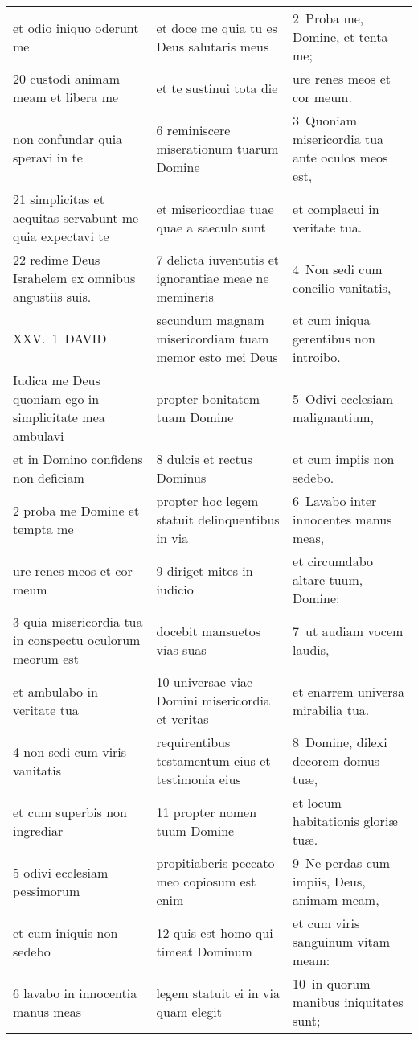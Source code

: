 \documentclass{article}
\begin{document}
\begin{longtable}{@{}p{}p{}p{}@{}}
et odio iniquo oderunt me	&	et doce me quia tu es Deus salutaris meus	&	2 Proba me, Domine, et tenta me;	\\
20 custodi animam meam et libera me	&	et te sustinui tota die	&	ure renes meos et cor meum.	\\
non confundar quia speravi in te	&	6 reminiscere miserationum tuarum Domine	&	3 Quoniam misericordia tua ante oculos meos est,	\\
21 simplicitas et aequitas servabunt me quia expectavi te	&	et misericordiae tuae quae a saeculo sunt	&	et complacui in veritate tua.	\\
22 redime Deus Israhelem ex omnibus angustiis suis.	&	7 delicta iuventutis et ignorantiae meae ne memineris	&	4 Non sedi cum concilio vanitatis,	\\
XXV. 1 DAVID	&	secundum magnam misericordiam tuam memor esto mei Deus	&	et cum iniqua gerentibus non introibo.	\\
Iudica me Deus quoniam ego in simplicitate mea ambulavi	&	propter bonitatem tuam Domine	&	5 Odivi ecclesiam malignantium,	\\
et in Domino confidens non deficiam	&	8 dulcis et rectus Dominus	&	et cum impiis non sedebo.	\\
2 proba me Domine et tempta me	&	propter hoc legem statuit delinquentibus in via	&	6 Lavabo inter innocentes manus meas,	\\
ure renes meos et cor meum	&	9 diriget mites in iudicio	&	et circumdabo altare tuum, Domine:	\\
3 quia misericordia tua in conspectu oculorum meorum est	&	docebit mansuetos vias suas	&	7 ut audiam vocem laudis,	\\
et ambulabo in veritate tua	&	10 universae viae Domini misericordia et veritas	&	et enarrem universa mirabilia tua.	\\
4 non sedi cum viris vanitatis	&	requirentibus testamentum eius et testimonia eius	&	8 Domine, dilexi decorem domus tuæ,	\\
et cum superbis non ingrediar	&	11 propter nomen tuum Domine	&	et locum habitationis gloriæ tuæ.	\\
5 odivi ecclesiam pessimorum	&	propitiaberis peccato meo copiosum est enim	&	9 Ne perdas cum impiis, Deus, animam meam,	\\
et cum iniquis non sedebo	&	12 quis est homo qui timeat Dominum	&	et cum viris sanguinum vitam meam:	\\
6 lavabo in innocentia manus meas	&	legem statuit ei in via quam elegit	&	10 in quorum manibus iniquitates sunt;	\\

\end{longtable}
\end{document}
